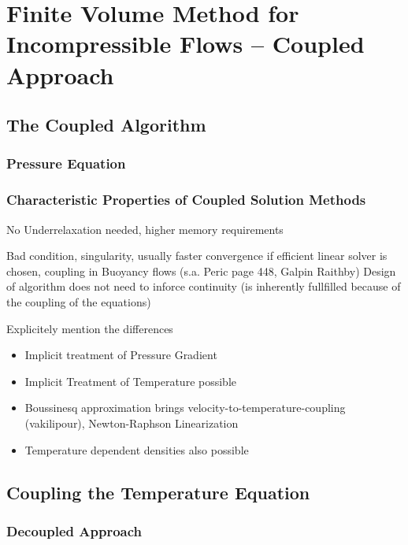   \section{Finite Volume Method for Incompressible Flows -- Coupled Approach}

    \subsection{The Coupled Algorithm}
      
      \subsubsection{Pressure Equation}

      \subsubsection{Characteristic Properties of Coupled Solution Methods}

        No Underrelaxation needed, higher memory requirements

        Bad condition, singularity, usually faster convergence if efficient linear solver is chosen, coupling in Buoyancy flows (s.a. Peric page 448, Galpin Raithby)
        Design of algorithm does not need to inforce continuity (is inherently fullfilled because of the coupling of the equations)

        Explicitely mention the differences

        \begin{itemize}
          \item Implicit treatment of Pressure Gradient
          \item Implicit Treatment of Temperature possible
          \item Boussinesq approximation brings velocity-to-temperature-coupling (vakilipour), Newton-Raphson Linearization
          \item Temperature dependent densities also possible
        \end{itemize}

    \subsection{Coupling the Temperature Equation}
      
      \subsubsection{Decoupled Approach}
